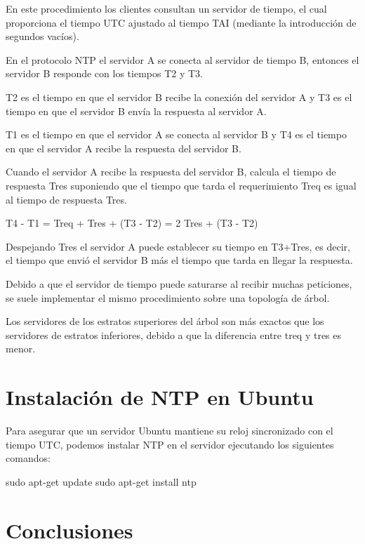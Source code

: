 En este procedimiento los clientes consultan un servidor de tiempo, el cual proporciona el tiempo UTC ajustado al tiempo TAI (mediante la introducción de segundos vacíos).

En el protocolo NTP el servidor A se conecta al servidor de tiempo B, entonces el servidor B responde con los tiempos T2 y T3.

T2 es el tiempo en que el servidor B recibe la conexión del servidor A y T3 es el tiempo en que el servidor B envía la respuesta al servidor A.

T1 es el tiempo en que el servidor A se conecta al servidor B y T4 es el tiempo en que el servidor A recibe la respuesta del servidor B.

Cuando el servidor A recibe la respuesta del servidor B, calcula el tiempo de respuesta Tres suponiendo que el tiempo que tarda el requerimiento Treq es igual al tiempo de respuesta Tres.

\begin{SourceCode}
T4 - T1 = Treq + Tres + (T3 - T2) = 2 Tres + (T3 - T2)
\end{SourceCode}

Despejando Tres el servidor A puede establecer su tiempo en T3+Tres, es decir, el tiempo que envió el servidor B más el tiempo que tarda en llegar la respuesta.

Debido a que el servidor de tiempo puede saturarse al recibir muchas peticiones,  se suele implementar el mismo procedimiento sobre una topología de árbol.

Los servidores de los estratos superiores del árbol son más exactos que los servidores de estratos inferiores, debido a que la diferencia entre treq y tres es menor.

\section{Instalación de NTP en Ubuntu}

Para asegurar que un servidor Ubuntu mantiene su reloj sincronizado con el tiempo UTC, podemos instalar NTP en el servidor ejecutando los siguientes comandos:

\begin{SourceCode}
sudo apt-get update
sudo apt-get install ntp
\end{SourceCode}

\section{Conclusiones}

